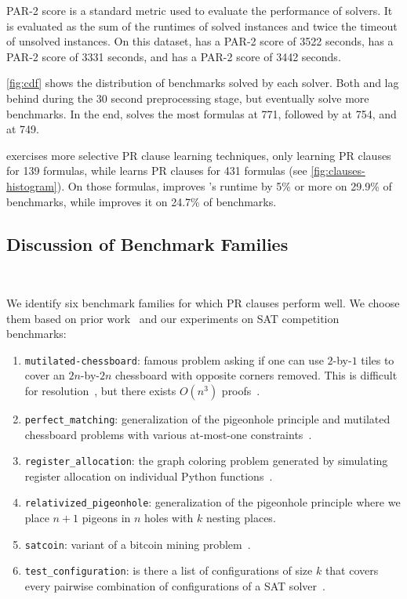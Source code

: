 PAR-2 score is a standard metric used to evaluate the performance of solvers. It
is evaluated as the sum of the runtimes of solved instances and twice the
timeout of unsolved instances. On this dataset, \cadical has a PAR-2 score of
3522 seconds, \prelearn has a PAR-2 score of 3331 seconds, and \tool has a PAR-2
score of 3442 seconds. 

\autoref{fig:cdf} shows the distribution of benchmarks solved by each solver.
Both \prelearn and \tool lag behind \cadical during the 30 second preprocessing
stage, but eventually solve more benchmarks. In the end, \prelearn solves the most
formulas at 771, followed by \tool at 754, and \cadical at 749. 


\tool exercises more selective PR clause learning techniques, only learning PR
clauses for 139 formulas, while \prelearn learns PR clauses for 431 formulas
(see \autoref{fig:clauses-histogram}). On those formulas, \tool improves
\cadical's runtime by 5\% or more on 29.9\% of benchmarks, while \prelearn improves it on
24.7\% of benchmarks.


\subsection{Discussion of Benchmark Families}~\label{subsec:eval-discussion}

We identify six benchmark families for which PR clauses perform well. We choose
them based on prior work~\cite{prelearn} and our experiments on SAT competition
benchmarks:

\begin{enumerate}
    \item \texttt{mutilated-chessboard}: famous problem asking if one can use
    $2$-by-$1$ tiles to cover an $2n$-by-$2n$ chessboard with opposite corners
    removed. This is difficult for
    resolution~\cite{mutilatedchessboard-exponential}, but there exists $O(n^3)$
    \pr proofs~\cite{mutilatedchessboard-pr}.
    \item \texttt{perfect\_matching}: generalization of the pigeonhole principle
    and mutilated chessboard problems with various at-most-one
    constraints~\cite{bipartgen}.
    \item \texttt{register\_allocation}: the graph coloring problem generated by
    simulating register allocation on individual Python
    functions~\cite{register-allocation}.
    \item \texttt{relativized\_pigeonhole}: generalization of the pigeonhole
    principle where we place $n+1$ pigeons in $n$ holes with $k$ nesting places.
    \item \texttt{satcoin}: variant of a bitcoin mining problem~\cite{satcoin}.
    \item \texttt{test\_configuration}: is there a list of configurations of
    size $k$ that covers every pairwise combination of configurations of a SAT
    solver~\cite{test-configuration}.
\end{enumerate}

